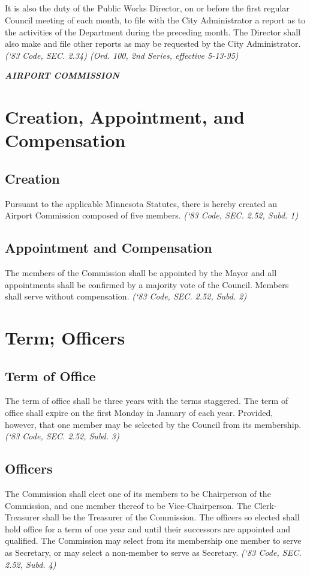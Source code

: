 \subsection{}
It is also the duty of the Public Works Director, on or before the first regular Council meeting of each month, to file with the City Administrator a report as to the activities of the Department during the preceding month.  The Director shall also make and file other reports as may be requested by the City Administrator.\newline
\emph{(‘83 Code, SEC. 2.34)  (Ord. 100, 2nd Series, effective 5-13-95)}\newline

\centerline{\textbf{\emph{\LARGE{AIRPORT COMMISSION}}}}
\setcounter{section}{99}
\section{Creation, Appointment, and Compensation}
\subsection{Creation}
Pursuant to the applicable Minnesota Statutes, there is hereby created an Airport Commission composed of five members.\newline
\emph{(‘83 Code, SEC. 2.52, Subd. 1)}
\subsection{Appointment and Compensation}
The members of the Commission shall be appointed by the Mayor and all appointments shall be confirmed by a majority vote of the Council.  Members shall serve without compensation.\newline
\emph{(‘83 Code, SEC. 2.52, Subd. 2)}
\section{Term; Officers}
\subsection{Term of Office}
The term of office shall be three years with the terms staggered.  The term of office shall expire on the first Monday in January of each year.  Provided, however, that one member may be selected by the Council from its membership.\newline
\emph{(‘83 Code, SEC. 2.52, Subd. 3)}
\subsection{Officers}
The Commission shall elect one of its members to be Chairperson of the Commission, and one member thereof to be Vice-Chairperson.  The Clerk-Treasurer shall be the Treasurer of the Commission.  The officers so elected shall hold office for a term of one year and until their successors are appointed and qualified.  The Commission may select from its membership one member to serve as Secretary, or may select a non-member to serve as Secretary.\newline
\emph{(‘83 Code, SEC. 2.52, Subd. 4)}
